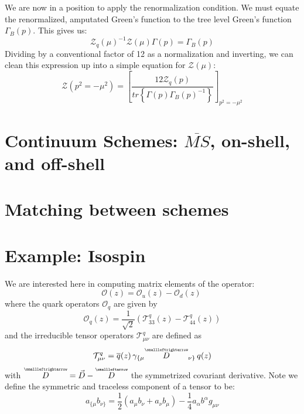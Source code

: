 \documentclass[11pt, oneside]{article}   	%
\theoremstyle{definition}
\newcommand{\cev}[1]{\overset{\scriptscriptstyle\smallleftarrow}{#1}}
\newcommand{\cevvec}[1]{\overset{\scriptscriptstyle\smallleftrightarrow}{#1}}
\begin{document}
We are now in a position to apply the renormalization condition. We must equate the renormalized, amputated Green's function 
to the tree level Green's function $\Gamma_B(p)$. This gives us:
\begin{equation}
	\mathcal Z_q(\mu)^{-1}\mathcal Z(\mu) \Gamma(p) = \Gamma_B(p)
\end{equation}
Dividing by a conventional factor of 12 as a normalization and inverting, we can clean this expression up into a simple equation 
for $\mathcal Z(\mu)$:
\begin{equation}
	\mathcal Z(p^2 = -\mu^2) = \left[\frac{12\mathcal Z_q(p)}{tr\left\{\Gamma(p)\Gamma_B(p)^{-1}\right\}}\right]_{p^2 
	= -\mu^2}
\end{equation}

\section{Continuum Schemes: $\overline{MS}$, on-shell, and off-shell}

\section{Matching between schemes}

\section{Example: Isospin}

We are interested here in computing matrix elements of the operator:
\begin{equation}
	\mathcal O(z) = \mathcal O_u(z) - \mathcal O_d(z)~
	\label{eq:operator_dfn}
\end{equation}
where the quark operators $\mathcal O_q$ are given by
\begin{equation}
	\mathcal O_q(z) = \frac{1}{\sqrt{2}}(\mathcal T^q_{33}(z) - \mathcal T^q_{44}(z))
\end{equation}
and the irreducible tensor operators $\mathcal T^q_{\mu\nu}$ are defined as
\begin{equation}
	\mathcal T^q_{\mu\nu} = \overline q(z)\, \gamma_{\{\mu} \cevvec{D}_{\nu\}}\, q(z)
\end{equation}
with $\cevvec D = \vec D - \cev D$ the symmetrized covariant derivative. Note we define the symmetric and traceless 
component of a tensor to be:
\begin{equation}
	a_{\{\mu}b_{\nu\}} = \frac{1}{2}(a_\mu b_\nu + a_\nu b_\mu) - \frac{1}{4}a_\alpha b^\alpha g_{\mu\nu}
\end{equation} 
\end{document}
